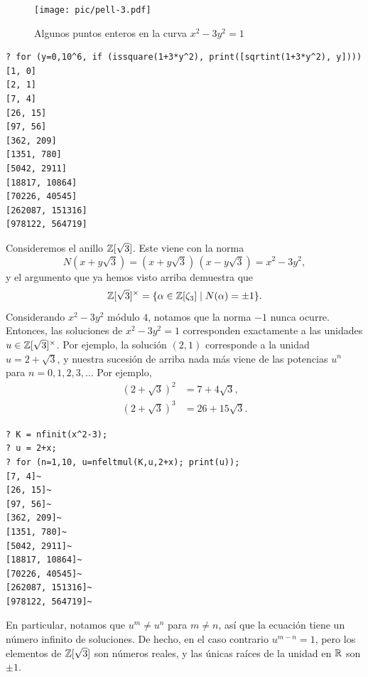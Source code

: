 \begin{figure}
  \begin{center}
    \texttt{[image: pic/pell-3.pdf]}
  \end{center}

  \caption{Algunos puntos enteros en la curva $x^2 - 3y^2 = 1$}
  \label{fig:pell-3}
\end{figure}

\begin{shaded}
\begin{verbatim}
? for (y=0,10^6, if (issquare(1+3*y^2), print([sqrtint(1+3*y^2), y])))
[1, 0]
[2, 1]
[7, 4]
[26, 15]
[97, 56]
[362, 209]
[1351, 780]
[5042, 2911]
[18817, 10864]
[70226, 40545]
[262087, 151316]
[978122, 564719]
\end{verbatim}
\end{shaded}

Consideremos el anillo $\mathbb{Z} [\sqrt{3}]$. Este viene con la norma
$$N (x + y\sqrt{3}) = (x + y\sqrt{3})\,(x - y\sqrt{3}) = x^2 - 3y^2,$$
y el argumento que ya hemos visto arriba demuestra que
\[ \mathbb{Z} [\sqrt{3}]^\times
       = \{ \alpha \in \mathbb{Z} [\zeta_3] \mid N (\alpha) = \pm 1 \}. \]
Considerando $x^2 - 3y^2$ módulo $4$, notamos que la norma $-1$ nunca
ocurre. Entonces, las soluciones de $x^2 - 3y^2 = 1$ corresponden exactamente
a las unidades $u \in \mathbb{Z} [\sqrt{3}]^\times$. Por ejemplo, la solución $(2,1)$
corresponde a la unidad $u = 2 + \sqrt{3}$, y nuestra sucesión de arriba nada
más viene de las potencias $u^n$ para $n = 0,1,2,3,\ldots$ Por ejemplo,
\begin{align*}
  (2 + \sqrt{3})^2 & = 7 + 4\sqrt{3},\\
  (2 + \sqrt{3})^3 & = 26 + 15\sqrt{3}.
\end{align*}

\begin{shaded}
\begin{verbatim}
? K = nfinit(x^2-3);
? u = 2+x;
? for (n=1,10, u=nfeltmul(K,u,2+x); print(u));
[7, 4]~
[26, 15]~
[97, 56]~
[362, 209]~
[1351, 780]~
[5042, 2911]~
[18817, 10864]~
[70226, 40545]~
[262087, 151316]~
[978122, 564719]~
\end{verbatim}
\end{shaded}

En particular, notamos que $u^m \ne u^n$ para $m \ne n$, así que la ecuación
tiene un número infinito de soluciones. De hecho, en el caso contrario
$u^{m-n} = 1$, pero los elementos de $\mathbb{Z} [\sqrt{3}]$ son números reales,
y las únicas raíces de la unidad en $\mathbb{R}$ son $\pm 1$.

